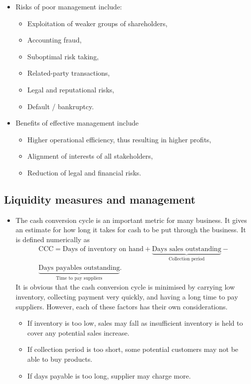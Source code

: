 \documentclass[../notes_compiled.tex]{subfiles}
\begin{document}
\begin{itemize}
\item Risks of poor management include:
\begin{itemize}
\item Exploitation of weaker groups of shareholders,
\item Accounting fraud,
\item Suboptimal risk taking,
\item Related-party transactions,
\item Legal and reputational risks,
\item Default / bankruptcy.
\end{itemize}

\item Benefits of effective management include
\begin{itemize}
\item Higher operational efficiency, thus resulting in higher profits,
\item Alignment of interests of all stakeholders,
\item Reduction of legal and financial risks.
\end{itemize}
\end{itemize}

\subsection{Liquidity measures and management}
\begin{itemize}
\item The cash conversion cycle is an important metric for many business. It gives an estimate for how long it takes for cash to be put through the business. It is defined numerically as
\begin{multline}
\text{CCC} = \text{Days of inventory on hand} + \underbrace{\text{Days sales outstanding}}_{\text{Collection period}} - \\ \underbrace{\text{Days payables outstanding}}_{\text{Time to pay suppliers}}. \label{ccc}
\end{multline}
It is obvious that the cash conversion cycle is minimised by carrying low inventory, collecting payment very quickly, and having a long time to pay suppliers. However, each of these factors has their own considerations.
\begin{itemize}
\item If inventory is too low, sales may fall as insufficient inventory is held to cover any potential sales increase.
\item If collection period is too short, some potential customers may not be able to buy products.
\item If days payable is too long, supplier may charge more.
\end{itemize}
\end{itemize}
\end{document}
